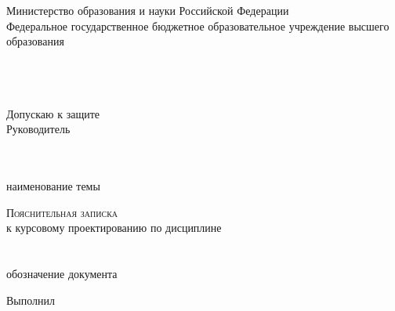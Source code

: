 \begin{titlepage}
\newpage



\makeatletter

\begin{center}
Министерство образования и науки Российской Федерации \\
Федеральное государственное бюджетное образовательное учреждение высшего образования \\
\vspace{0.5cm}
{\bf \textsc \university} \\
\vspace{0.5cm}
 \\
 \\
\end{center}

\begin{flushright}
	\begin{minipage}[H]{0.45\textwidth}
		Допускаю к защите \\
		Руководитель \\
		 \
	\end{minipage}
\end{flushright}

\begin{center}
	\uline{\hfill \textsc \yourTitle \hspace*{\fill}} \\
	\vspace{-0.1cm}
	\footnotesize{наименование темы}
\end{center}

\begin{center}
	\textsc{Пояснительная записка} \\
	к курсовому проектированию по дисциплине \\
	\uline{\hfill \textsc \discipline \hspace*{\fill}} \\
	\uline{\phantom{MM} \variant \phantom{MM}} \\
	\vspace{-0.1cm}
	\footnotesize{обозначение документа}
\end{center}


\vspace{3cm}


\noindent
Выполнил \hspace{1.2cm} \yourType \hspace{0.2cm}  \hspace{0.2cm}  \hspace{0.2cm} 


\end{titlepage}
